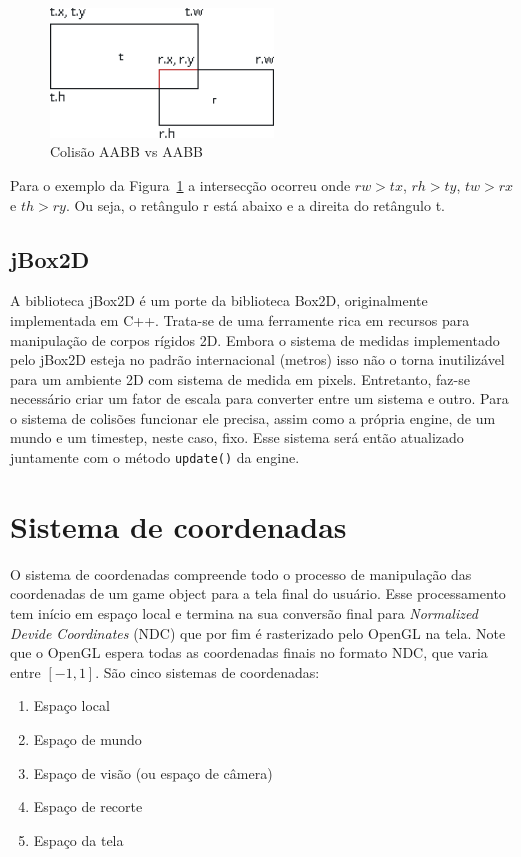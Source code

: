 \documentclass[12pt, 
openright, 
oneside, 
a4paper,    
brazil]{facom-ufu-abntex2}
\begin{document}
\begin{figure}[H]
	\centering
	\includegraphics[width=16em]{imagens/aabbaabb.png}
	\caption{Colisão AABB vs AABB}
	\label{fig:AABBvsAABB}
\end{figure}

Para o exemplo da Figura~\ref{fig:AABBvsAABB} a intersecção ocorreu onde $rw > tx$, $rh > ty$, $tw > rx$ e $th > ry$. Ou seja, o retângulo r está abaixo e a direita do retângulo t.

\subsection{jBox2D}

A biblioteca jBox2D é um porte da biblioteca Box2D, originalmente implementada em C++. Trata-se de uma ferramente rica em recursos para manipulação de corpos rígidos 2D. Embora o sistema de medidas implementado pelo jBox2D esteja no padrão internacional (metros) isso não o torna inutilizável para um ambiente 2D com sistema de medida em pixels. Entretanto, faz-se necessário criar um fator de escala para converter entre um sistema e outro. Para o sistema de colisões funcionar ele precisa, assim como a própria engine, de um mundo e um timestep, neste caso, fixo. Esse sistema será então atualizado juntamente com o método \texttt{update()} da engine.

\section{Sistema de coordenadas}

O sistema de coordenadas compreende todo o processo de manipulação das coordenadas de um game object para a tela final do usuário. Esse processamento tem início em espaço local e termina na sua conversão final para \textit{Normalized Devide Coordinates} (NDC) que por fim é rasterizado pelo OpenGL na tela. Note que o OpenGL espera todas as coordenadas finais no formato NDC, que varia entre $[-1,1]$. São cinco sistemas de coordenadas:

\begin{enumerate}
    \item Espaço local
    \item Espaço de mundo
    \item Espaço de visão (ou espaço de câmera)
    \item Espaço de recorte
    \item Espaço da tela
\end{enumerate}
\end{document}
